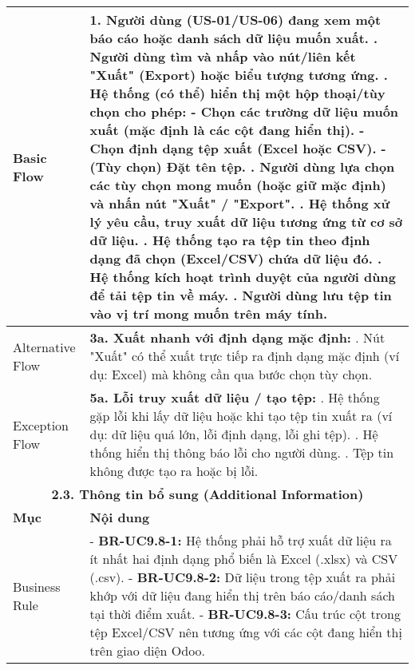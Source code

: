 \begin{longtable}{|m{4cm}|p{11cm}|}
Basic Flow & 1. Người dùng (US-01/US-06) đang xem một báo cáo hoặc danh sách dữ liệu muốn xuất. \newline 2. Người dùng tìm và nhấp vào nút/liên kết "Xuất" (Export) hoặc biểu tượng tương ứng. \newline 3. Hệ thống (có thể) hiển thị một hộp thoại/tùy chọn cho phép: \newline    - Chọn các trường dữ liệu muốn xuất (mặc định là các cột đang hiển thị). \newline    - Chọn định dạng tệp xuất (Excel hoặc CSV). \newline    - (Tùy chọn) Đặt tên tệp. \newline 4. Người dùng lựa chọn các tùy chọn mong muốn (hoặc giữ mặc định) và nhấn nút "Xuất" / "Export". \newline 5. Hệ thống xử lý yêu cầu, truy xuất dữ liệu tương ứng từ cơ sở dữ liệu. \newline 6. Hệ thống tạo ra tệp tin theo định dạng đã chọn (Excel/CSV) chứa dữ liệu đó. \newline 7. Hệ thống kích hoạt trình duyệt của người dùng để tải tệp tin về máy. \newline 8. Người dùng lưu tệp tin vào vị trí mong muốn trên máy tính. \\
\hline
Alternative Flow & \textbf{3a. Xuất nhanh với định dạng mặc định:} \newline    1. Nút "Xuất" có thể xuất trực tiếp ra định dạng mặc định (ví dụ: Excel) mà không cần qua bước chọn tùy chọn. \\
\hline
Exception Flow & \textbf{5a. Lỗi truy xuất dữ liệu / tạo tệp:} \newline    1. Hệ thống gặp lỗi khi lấy dữ liệu hoặc khi tạo tệp tin xuất ra (ví dụ: dữ liệu quá lớn, lỗi định dạng, lỗi ghi tệp). \newline    2. Hệ thống hiển thị thông báo lỗi cho người dùng. \newline    3. Tệp tin không được tạo ra hoặc bị lỗi. \\
\hline
\multicolumn{2}{|c|}{\textbf{2.3. Thông tin bổ sung (Additional Information)}} \\
\hline
\textbf{Mục} & \textbf{Nội dung} \\
\hline
Business Rule & - \textbf{BR-UC9.8-1:} Hệ thống phải hỗ trợ xuất dữ liệu ra ít nhất hai định dạng phổ biến là Excel (.xlsx) và CSV (.csv). \newline - \textbf{BR-UC9.8-2:} Dữ liệu trong tệp xuất ra phải khớp với dữ liệu đang hiển thị trên báo cáo/danh sách tại thời điểm xuất. \newline - \textbf{BR-UC9.8-3:} Cấu trúc cột trong tệp Excel/CSV nên tương ứng với các cột đang hiển thị trên giao diện Odoo. \\

\end{longtable}
